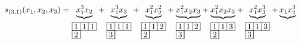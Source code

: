 \begin{align*}
  s_{(3,1)}(x_1, x_2, x_3) &=
  \underbrace{x_1^3x_2}_{
  \begin{tikzpicture}[scale=0.35, baseline=-0.5ex]
    \draw (0,0) rectangle (3,1);
    \draw (0,-1) rectangle (1,0);
    \draw (1,-1)--(1,1);
    \draw (2,0)--(2,1);
    \node at (0.5,0.5) {$1$};  \node at (1.5,0.5) {$1$}; \node at (2.5,0.5) {$1$};
    \node at (0.5,-0.5) {$2$};
  \end{tikzpicture}
  }
  +
  \underbrace{x_1^3x_3}_{
  \begin{tikzpicture}[scale=0.35, baseline=-0.5ex]
    \draw (0,0) rectangle (3,1);
    \draw (0,-1) rectangle (1,0);
    \draw (1,-1)--(1,1);
    \draw (2,0)--(2,1);
    \node at (0.5,0.5) {$1$};  \node at (1.5,0.5) {$1$}; \node at (2.5,0.5) {$1$};
    \node at (0.5,-0.5) {$3$};
  \end{tikzpicture}
  }
  +
  \underbrace{x_1^2x_2^2}_{
  \begin{tikzpicture}[scale=0.35, baseline=-0.5ex]
    \draw (0,0) rectangle (3,1);
    \draw (0,-1) rectangle (1,0);
    \draw (1,-1)--(1,1);
    \draw (2,0)--(2,1);
    \node at (0.5,0.5) {$1$};  \node at (1.5,0.5) {$1$}; \node at (2.5,0.5) {$2$};
    \node at (0.5,-0.5) {$2$};
  \end{tikzpicture}
  }+
  \underbrace{x_1^2x_2x_3}_{
  \begin{tikzpicture}[scale=0.35, baseline=-0.5ex]
    \draw (0,0) rectangle (3,1);
    \draw (0,-1) rectangle (1,0);
    \draw (1,-1)--(1,1);
    \draw (2,0)--(2,1);
    \node at (0.5,0.5) {$1$};  \node at (1.5,0.5) {$1$}; \node at (2.5,0.5) {$2$};
    \node at (0.5,-0.5) {$3$};
  \end{tikzpicture}
  }
  +
  \underbrace{x_1^2x_2x_3}_{
  \begin{tikzpicture}[scale=0.35, baseline=-0.5ex]
    \draw (0,0) rectangle (3,1);
    \draw (0,-1) rectangle (1,0);
    \draw (1,-1)--(1,1);
    \draw (2,0)--(2,1);
    \node at (0.5,0.5) {$1$};  \node at (1.5,0.5) {$1$}; \node at (2.5,0.5) {$3$};
    \node at (0.5,-0.5) {$2$};
  \end{tikzpicture}
  }
  +
  \underbrace{x_1^2x_3^3}_{
  \begin{tikzpicture}[scale=0.35, baseline=-0.5ex]
    \draw (0,0) rectangle (3,1);
    \draw (0,-1) rectangle (1,0);
    \draw (1,-1)--(1,1);
    \draw (2,0)--(2,1);
    \node at (0.5,0.5) {$1$};  \node at (1.5,0.5) {$1$}; \node at (2.5,0.5) {$3$};
    \node at (0.5,-0.5) {$3$};
  \end{tikzpicture}
  }
  +
  \underbrace{x_1x_2^3}_{
}
\end{align*}
